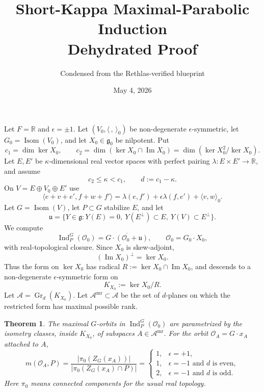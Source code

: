 \documentclass[10pt]{article}
\title{\vspace{-2.2em}Short-Kappa Maximal-Parabolic Induction\\
\large Dehydrated Proof}
\author{Condensed from the Rethlas-verified blueprint}
\date{May 4, 2026}
\newtheorem*{theorem}{Theorem}
\newcommand{\g}{\mathfrak g}
\newcommand{\uP}{\mathfrak u}
\newcommand{\OO}{\mathcal O}
\newcommand{\K}{K_{X_0}}
\newcommand{\A}{\mathscr A}
\newcommand{\Amr}{\mathscr A^{\mathrm{mr}}}
\newcommand{\im}{\operatorname{Im}}
\begin{document}
\maketitle
\vspace{-1.5em}
\small

Let \(F=\mathbb R\) and \(\epsilon=\pm1\).  Let
\((V_0,\langle\,,\,\rangle_0)\) be non-degenerate \(\epsilon\)-symmetric,
let \(G_0=\operatorname{Isom}(V_0)\), and let \(X_0\in\mathfrak g_0\) be
nilpotent.  Put
\[
c_1=\dim\ker X_0,\qquad
c_2=\dim(\ker X_0\cap\im X_0)=\dim(\ker X_0^2/\ker X_0).
\]
Let \(E,E'\) be \(\kappa\)-dimensional real vector spaces with perfect pairing
\(\lambda:E\times E'\to\mathbb R\), and assume
\[
c_2\le \kappa<c_1,\qquad d:=c_1-\kappa.
\]
On \(V=E\oplus V_0\oplus E'\) use
\[
\langle e+v+e',f+w+f'\rangle
=\lambda(e,f')+\epsilon\lambda(f,e')+\langle v,w\rangle_0 .
\]
Let \(G=\operatorname{Isom}(V)\), let \(P\subset G\) stabilize \(E\), and let
\[
\uP=\{Y\in\g:Y(E)=0,\ Y(E^\perp)\subset E,\ Y(V)\subset E^\perp\}.
\]
We compute
\[
\operatorname{Ind}_P^G(\OO_0)=\overline{G\cdot(\OO_0+\uP)},
\qquad \OO_0=G_0\cdot X_0 ,
\]
with real-topological closure.  Since \(X_0\) is skew-adjoint,
\[
(\im X_0)^\perp=\ker X_0.
\]
Thus the form on \(\ker X_0\) has radical
\(R:=\ker X_0\cap\im X_0\), and descends to a non-degenerate
\(\epsilon\)-symmetric form on
\[
\K:=\ker X_0/R .
\]
Let \(\A=\operatorname{Gr}_d(\K)\).  Let \(\Amr\subset\A\) be the set of
\(d\)-planes on which the restricted form has maximal possible rank.

\begin{theorem}
The maximal \(G\)-orbits in \(\operatorname{Ind}_P^G(\OO_0)\) are parametrized
by the isometry classes, inside \(\K\), of subspaces \(A\in\Amr\).
For the orbit \(\OO_A=G\cdot x_A\) attached to \(A\),
\[
m(\OO_A,P)=
\frac{|\pi_0(Z_G(x_A))|}{|\pi_0(Z_G(x_A)\cap P)|}
=
\begin{cases}
1,& \epsilon=+1,\\
1,& \epsilon=-1\text{ and }d\text{ is even},\\
2,& \epsilon=-1\text{ and }d\text{ is odd}.
\end{cases}
\]
Here \(\pi_0\) means connected components for the usual real topology.
\end{theorem}
\end{document}
